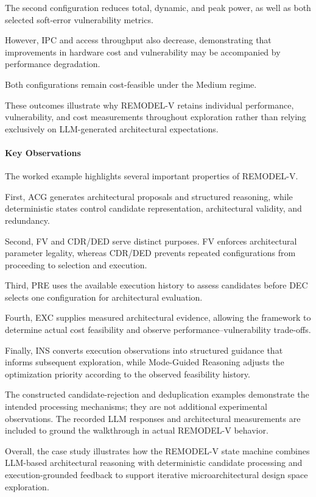 The second configuration reduces
total, dynamic, and peak power,
as well as both selected soft-error
vulnerability metrics.

However, IPC and access throughput
also decrease, demonstrating that
improvements in hardware cost and
vulnerability may be accompanied
by performance degradation.

Both configurations remain
cost-feasible under the Medium regime.

These outcomes illustrate why
REMODEL-V retains individual
performance, vulnerability, and
cost measurements throughout
exploration rather than relying
exclusively on LLM-generated
architectural expectations.

\paragraph{Key Observations}

The worked example highlights several
important properties of REMODEL-V.

First, ACG generates architectural
proposals and structured reasoning,
while deterministic states control
candidate representation, architectural
validity, and redundancy.

Second, FV and CDR/DED serve distinct
purposes. FV enforces architectural
parameter legality, whereas CDR/DED
prevents repeated configurations from
proceeding to selection and execution.

Third, PRE uses the available execution
history to assess candidates before
DEC selects one configuration for
architectural evaluation.

Fourth, EXC supplies measured
architectural evidence, allowing
the framework to determine actual
cost feasibility and observe
performance--vulnerability trade-offs.

Finally, INS converts execution
observations into structured guidance
that informs subsequent exploration,
while Mode-Guided Reasoning adjusts
the optimization priority according
to the observed feasibility history.

The constructed candidate-rejection
and deduplication examples demonstrate
the intended processing mechanisms;
they are not additional experimental
observations. The recorded LLM
responses and architectural measurements
are included to ground the walkthrough
in actual REMODEL-V behavior.

Overall, the case study illustrates
how the REMODEL-V state machine
combines LLM-based architectural
reasoning with deterministic candidate
processing and execution-grounded
feedback to support iterative
microarchitectural design space
exploration.
